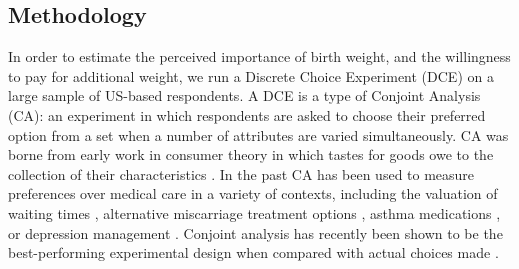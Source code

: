\documentclass[a4paper, 11pt]{article}
\begin{document}
\begin{spacing}{1.4}
\section{Methodology}
\label{scn:methods}
In order to estimate the perceived importance of birth weight, and the willingness
to pay for additional weight, we run a Discrete Choice Experiment (DCE) on a
large sample of US-based respondents. A DCE is a type of Conjoint Analysis (CA):
an experiment in which respondents are asked to choose their preferred option
from a set when a number of attributes are varied simultaneously.
CA was borne from early work in consumer theory in which tastes for goods owe
to the collection of their characteristics \citep{Lancaster1966}.  In the
past CA has been used to measure preferences over medical care in a variety of
contexts, including the valuation of waiting times \citep{Propper1990,Propper1995},
alternative miscarriage treatment options \citep{RyanHughes1997}, asthma
medications \citep{Kingetal2007}, or depression management \citep{Wittinketal2010}.
Conjoint analysis has recently been shown to be the best-performing experimental
design when compared with actual choices made \citep{Hainmuelleretal2015}.


\end{spacing}
\end{document}
